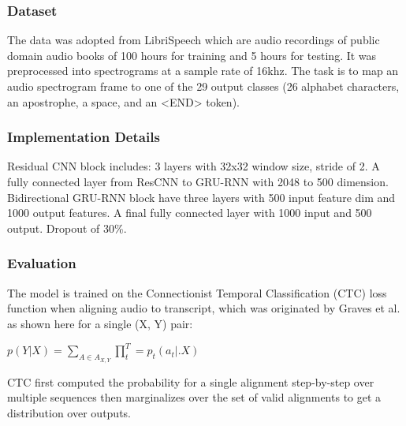 



\subsubsection{Dataset}

The data was adopted from LibriSpeech \cite{7178964} which are audio recordings of public domain audio books of 100 hours for training and 5 hours for testing. It was preprocessed into spectrograms at a sample rate of 16khz. The task is to map an audio spectrogram frame to one of the 29 output classes (26 alphabet characters, an apostrophe, a space, and an <END> token). 


\subsubsection{Implementation Details}

Residual CNN block includes: 3 layers with 32x32 window size, stride of 2. A fully connected layer from ResCNN to GRU-RNN with 2048 to 500 dimension. Bidirectional GRU-RNN block have three layers with 500 input feature dim and 1000 output features. A final fully connected layer with 1000 input and 500 output. Dropout of 30\%.


\subsubsection{Evaluation}

The model is trained on the Connectionist Temporal Classification (CTC) loss function when aligning audio to transcript, which was originated by Graves et al. \cite{CTC} as shown here for a single (X, Y) pair: 
\begin{center}
$p(Y | X) = \sum_{A\in A_{X, Y}} \prod_t^T = p_t(a_t |. X)$    
\end{center}

CTC first computed the probability for a single alignment step-by-step over multiple sequences then marginalizes over the set of valid alignments to get a distribution over outputs.  